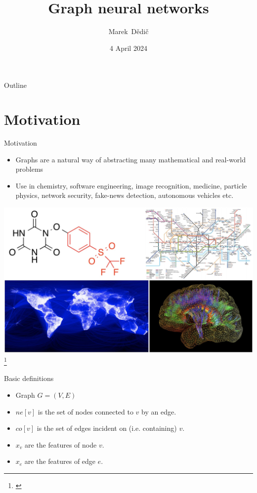 \documentclass[10pt]{beamer}
\title[Graph neural networks]
{
	Graph neural networks
}
\date[2024-04-04]{4 April 2024}
\author[Marek Dědič]
{
	Marek~Dědič
}
\begin{document}
\begin{frame}
	\titlepage
\end{frame}

\begin{frame}{Outline}
	\tableofcontents
\end{frame}


\section{Motivation}

\begin{frame}{Motivation}
	\begin{itemize}
		\item Graphs are a natural way of abstracting many mathematical and real-world problems
		\item Use in chemistry, software engineering, image recognition, medicine, particle physics, network security, fake-news detection, autonomous vehicles etc.
	\end{itemize}
	\centering
	\includegraphics[width=0.7\pagewidth]{images/graphs.png}\footnote{\cite{velickovic_opening_2020}}
\end{frame}

\begin{frame}{Basic definitions}
	\begin{itemize}
		\item Graph \( G = \left( V, E \right) \)
		\item \( ne \left[ v \right] \) is the set of nodes connected to \( v \) by an edge.
		\item \( co \left[ v \right] \) is the set of edges incident on (i.e. containing) \( v \).
		\item \( x_v \) are the features of node \( v \).
		\item \( x_e \) are the features of edge \( e \).
	\end{itemize}
\end{frame}
\end{document}
